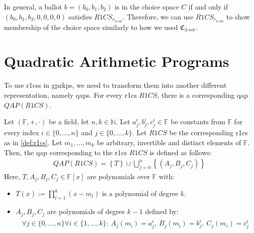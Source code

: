 In general, a ballot $b=(b_0,b_1,b_2)$ is in the choice space $C$ if and only if $(b_0,b_1,b_2,0,0,0,0)$ satisfies $R1CS_{r_{3\text{-}vot}}$.
Therefore, we can use $R1CS_{r_{3\text{-}vot}}$ to show membership of the choice space similarly to how we used $\mathfrak{C}_{3\text{-}vot}$.

\newpage
\section{Quadratic Arithmetic Programs}
To use \glspl{r1cs} in \glspl{gpzkp}, we need to transform them into another different representation, namely \glspl{qap}.
For every \gls{r1cs} $R1CS$, there is a corresponding \gls{qap} $QAP(R1CS)$.

\begin{definition}
    \label{def:qap}
    Let $(\mathbb{F},+,\cdot )$ be a field, let $n,k\in\mathbb{N}$.
    Let $a_j^i,b_j^i,c_j^i\in\mathbb{F}$ be constants from $\mathbb{F}$ for every index $i\in\{0,\dots, n\}$ and $j\in\{0,\dots, k\}$.
    Let $R1CS$ be the corresponding \gls{r1cs} as in \cref{def:r1cs}.
    Let $m_1,\dots, m_k$ be arbitrary, invertible and distinct elements of $\mathbb{F}$.
    Then, the \gls{qap} corresponding to the \gls{r1cs} $R1CS$ is defined as follows:
    \begin{align*}
        QAP(R1CS)=\left\{T\right\}\cup \bigcup_{j=0}^{n}\left\{\left(A_j, B_j, C_j\right)\right\} %
    \end{align*}
    Here, $T, A_j, B_j, C_j\in\mathbb{F}[x]$ are polynomials over $\mathbb{F}$ with:
    \begin{itemize}
        \item $T(x):=\prod\limits_{l=1}^k(x-m_l)$ is a polynomial of degree $k$.
        \item $A_j, B_j, C_j$ are polynomials of degree $k-1$ defined by:
        \begin{align*}
            \forall j\in\{0,\dots, n\}\forall i\in\{1,\dots, k\}: \:A_j(m_i)=a_j^{i},\:B_j(m_i)=b_j^{i},\: C_j(m_i)=c_j^{i}
        \end{align*}
    \end{itemize}
\end{definition}


